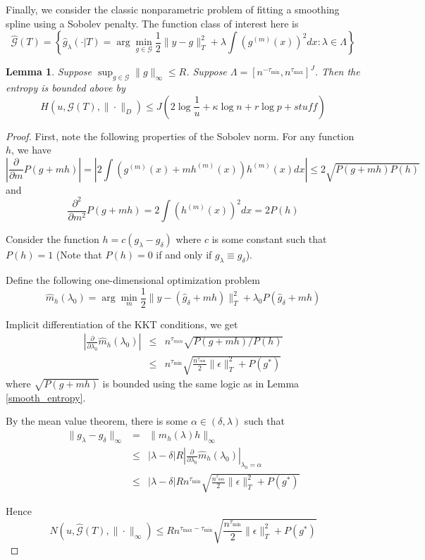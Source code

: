 \documentclass[12pt]{article}
\newtheorem{lemma}{Lemma}
\begin{document}
Finally, we consider the classic nonparametric problem of fitting a smoothing spline using a Sobolev penalty. The function class of interest here is
\[
\hat{\mathcal{G}}(T)=\left\{ \hat{g}_{\lambda}(\cdot|T)=\arg\min_{g\in\mathcal{G}}\frac{1}{2}\|y-g\|_{T}^{2}+\lambda \int (g^{(m)}(x))^2 dx :\lambda\in\Lambda\right\} 
\]

\begin{lemma}
Suppose $\sup_{g \in \mathcal{G}} \|g\|_\infty \le R$.
Suppose $\Lambda = [n^{- \tau_{\min}} , n^{\tau_{\max}}]^J$. 
Then the entropy is bounded above by
\begin{equation}
H \left ( u, \mathcal{G}(T), \| \cdot \|_D \right ) \le J \left ( 2 \log \frac{1}{u} + \kappa \log n + r \log p + stuff \right )
\end{equation}
\end{lemma}

\begin{proof}
First, note the following properties of the Sobolev norm. For any function $h$, we have
\[
\left | \frac{\partial}{\partial m}P(g+mh) \right | = \left | 2\int(g^{(m)}(x)+mh^{(m)}(x))h^{(m)}(x)dx \right | \le 2\sqrt{P(g+mh)P(h)}
\]
and 
\[
\frac{\partial^{2}}{\partial m^{2}}P(g+mh)=2\int(h^{(m)}(x))^{2}dx=2P(h)
\]

Consider the function $h=c(g_{\lambda}-g_{\delta})$ where $c$ is some constant such that $P(h) = 1$ (Note that $P(h) = 0$ if and only if $g_{\lambda} \equiv g_{\delta}$).

Define the following one-dimensional optimization problem
\[
\hat{m}_{h}(\lambda_0)=\arg\min_{m}\frac{1}{2}\|y-(\hat{g}_{\delta}+mh)\|_{T}^{2}+\lambda_0 P(\hat{g}_{\delta}+mh)
\]

Implicit differentiation of the KKT conditions, we get
\begin{eqnarray*}
\left|\frac{\partial}{\partial\lambda_0}\hat{m}_{h}(\lambda_0)\right| & \le & n^{\tau_{min}}\sqrt{P(g+mh) / P(h)}\\
 & \le & n^{\tau_{\min}}\sqrt{ \frac{n^{\tau_{\min}}}{2} \|\epsilon \|_T^2 +  P(g^*)}
\end{eqnarray*}
where $\sqrt{P(g+mh)}$ is bounded using the same logic as in Lemma \ref{smooth_entropy}.

By the mean value theorem, there is some $\alpha \in (\delta, \lambda)$ such that
\begin{eqnarray*}
\|g_{\lambda}-g_{\delta}\|_{\infty} & = & \|\hat{m}_{h}(\lambda)h\|_{\infty}\\
 & \le & |\lambda-\delta| R \left|\frac{\partial}{\partial\lambda_0}\hat{m}_{h}(\lambda_0)\right|_{\lambda_0 = \alpha}\\
 & \le & |\lambda-\delta| R n^{\tau_{\min}}\sqrt{ \frac{n^{\tau_{\min}}}{2} \|\epsilon \|_T^2 +  P(g^*)}
\end{eqnarray*}

Hence
\[
N\left(u,\hat{\mathcal{G}}(T),\|\cdot\|_{\infty}\right)\le R n^{\tau_{\max} - \tau_{\min}}\sqrt{ \frac{n^{\tau_{\min}}}{2} \|\epsilon \|_T^2 +  P(g^*)}
\]
\end{proof}
\end{document}
